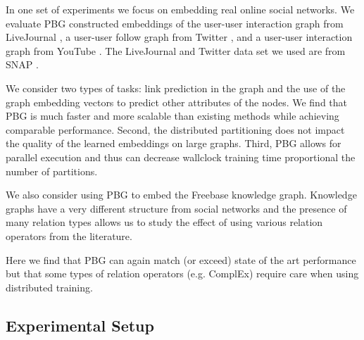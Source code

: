 \documentclass{article}
\begin{document}
In one set of experiments we focus on embedding real online social networks. We evaluate PBG constructed embeddings of the user-user interaction graph from LiveJournal \cite{backstrom2006group} \cite{leskovec2009community}, a user-user follow graph from Twitter \cite{kwak2010twitter} \cite{boldi2004webgraph} \cite{boldi2011layered}, and a user-user interaction graph from YouTube \cite{tang2009scalable}. The LiveJournal and Twitter data set we used are from SNAP \cite{snapnets}.

We consider two types of tasks: link prediction in the graph and the use of the graph embedding vectors to predict other attributes of the nodes. We find that PBG is much faster and more scalable than existing methods while achieving comparable performance. Second, the distributed partitioning does not impact the quality of the learned embeddings on large graphs. Third, PBG allows for parallel execution and thus can decrease wallclock training time proportional the number of partitions.

We also consider using PBG to embed the Freebase knowledge graph. Knowledge graphs have a very different structure from social networks and the presence of many relation types allows us to study the effect of using various relation operators from the literature.

Here we find that PBG can again match (or exceed) state of the art performance but that some types of relation operators (e.g. ComplEx) require care when using distributed training. 







\subsection{Experimental Setup}
\end{document}
